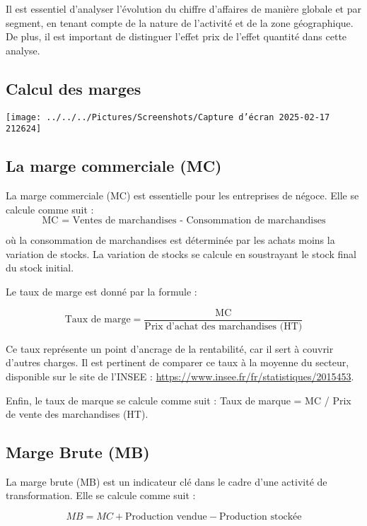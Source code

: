 \documentclass[a4paper, 12pt]{report}
\begin{document}
Il est essentiel d'analyser l'évolution du chiffre d'affaires de manière globale et par segment, en tenant compte de la nature de l'activité et de la zone géographique. De plus, il est important de distinguer l'effet prix de l'effet quantité dans cette analyse.

\subsection{Calcul des marges}

\begin{center}
	\texttt{[image: ../../../Pictures/Screenshots/Capture d'écran 2025-02-17 212624]}
\end{center}

\subsection{La marge commerciale (MC)}

La marge commerciale (MC) est essentielle pour les entreprises de négoce. Elle se calcule comme suit : 
\[ \text{MC = Ventes de marchandises - Consommation de marchandises} \]

où la consommation de marchandises est déterminée par les achats moins la variation de stocks. La variation de stocks se calcule en soustrayant le stock final du stock initial. 

Le taux de marge est donné par la formule : 

\[ \text{Taux de marge} = \frac{\text{MC}}{\text{Prix d'achat des marchandises (HT)}}   \]

Ce taux représente un point d'ancrage de la rentabilité, car il sert à couvrir d'autres charges. Il est pertinent de comparer ce taux à la moyenne du secteur, disponible sur le site de l'INSEE : \url{https://www.insee.fr/fr/statistiques/2015453}. 

Enfin, le taux de marque se calcule comme suit : Taux de marque = MC / Prix de vente des marchandises (HT).

\subsection{Marge Brute (MB)}

La marge brute (MB) est un indicateur clé dans le cadre d'une activité de transformation. Elle se calcule comme suit : 

\[ 
MB = MC + \text{Production vendue} - \text{Production stockée} 
\]
\end{document}
